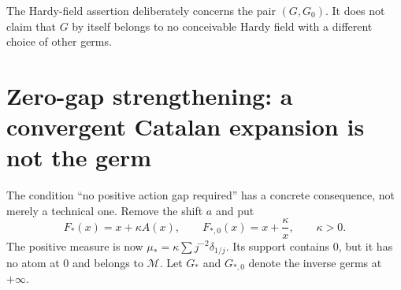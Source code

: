 \documentclass[11pt,a4paper]{article}
\theoremstyle{definition}
\theoremstyle{remark}
\numberwithin{equation}{section}
\begin{document}
The Hardy-field assertion deliberately concerns the pair $(G,G_0)$. It does not claim that $G$ by itself belongs to no conceivable Hardy field with a different choice of other germs.

\section{Zero-gap strengthening: a convergent Catalan expansion is not the germ}\label{sec:zerogap}
The condition ``no positive action gap required'' has a concrete consequence, not merely a technical one. Remove the shift $a$ and put
\begin{equation}\label{eq:zerogapmaps}
 F_*(x)=x+\kappa A(x),\qquad F_{*,0}(x)=x+\frac\kappa x,
 \qquad\kappa>0.
\end{equation}
The positive measure is now $\mu_* =\kappa\sum j^{-2}\delta_{1/j}$. Its support contains $0$, but it has no atom at $0$ and belongs to $\mathcal M$. Let $G_*$ and $G_{*,0}$ denote the inverse germs at $+\infty$.
\end{document}
